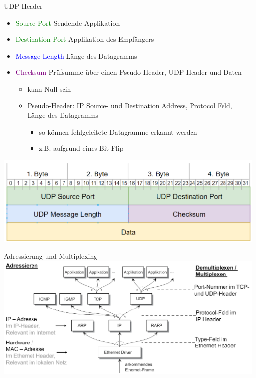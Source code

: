 \begin{concept}{UDP-Header}
    \begin{itemize}
        \item \textcolor{green}{Source Port} Sendende Applikation
        \item \textcolor{green}{Destination Port} Applikation des Empfängers
        \item \textcolor{blue}{Message Length} Länge des Datagramms
        \item \textcolor{purple}{Checksum} Prüfsumme über einen Pseudo-Header, UDP-Header und Daten
        \begin{itemize}
            \item kann Null sein
            \item Pseudo-Header: IP Source- und Destination Address, Protocol Feld, Länge des Datagramms
            \begin{itemize}
                \item so können fehlgeleitete Datagramme erkannt werden
                \item z.B. aufgrund eines Bit-Flip
            \end{itemize}
        \end{itemize}
    \end{itemize}
        \includegraphics[width=1\linewidth]{images/udp.png}
\end{concept}

\begin{concept}{Adressierung und Multiplexing}\\
        \includegraphics[width=1\linewidth]{images/adress_multiplex.png}
\end{concept}

